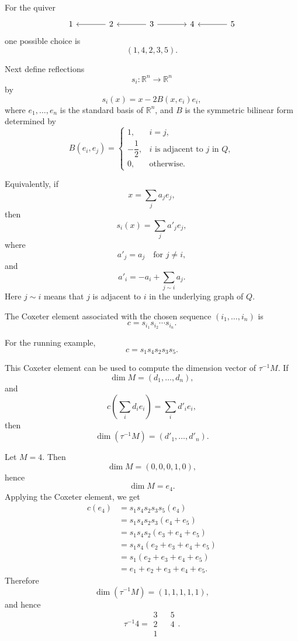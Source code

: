 \documentclass[11pt, a4paper]{report}
\begin{document}
For the quiver
\[
    \begin{tikzcd}[column sep=large]
        1 & 2 \arrow[l] & 3 \arrow[l] \arrow[r] & 4 & 5 \arrow[l]
    \end{tikzcd}
\]
one possible choice is
\[
    (1,4,2,3,5).
\]

Next define reflections
\[
    s_i:\mathbb{R}^n\longrightarrow \mathbb{R}^n
\]
by
\[
    s_i(x)=x-2B(x,e_i)e_i,
\]
where \(e_1,\dots,e_n\) is the standard basis of \(\mathbb{R}^n\), and \(B\) is
the symmetric bilinear form determined by
\[
    B(e_i,e_j)=
    \begin{cases}
        1, & i=j,\\[1mm]
        -\dfrac{1}{2}, & i \text{ is adjacent to } j \text{ in } Q,\\[2mm]
        0, & \text{otherwise}.
    \end{cases}
\]

Equivalently, if
\[
    x=\sum_j a_j e_j,
\]
then
\[
    s_i(x)=\sum_j a'_j e_j,
\]
where
\[
    a'_j=a_j \quad \text{for } j\neq i,
\]
and
\[
    a'_i=-a_i+\sum_{j\sim i}a_j.
\]
Here \(j\sim i\) means that \(j\) is adjacent to \(i\) in the underlying graph of
\(Q\).

\begin{definition}
    The Coxeter element associated with the chosen sequence
    \((i_1,\dots,i_n)\) is
    \[
        c=s_{i_1}s_{i_2}\cdots s_{i_n}.
    \]
\end{definition}

For the running example,
\[
    c=s_1s_4s_2s_3s_5.
\]

This Coxeter element can be used to compute the dimension vector of
\(\tau^{-1}M\). If
\[
    \dim M=(d_1,\dots,d_n),
\]
and
\[
    c\left(\sum_i d_i e_i\right)=\sum_i d'_i e_i,
\]
then
\[
    \dim(\tau^{-1}M)=(d'_1,\dots,d'_n).
\]

\begin{example}
    Let \(M=4\). Then
    \[
        \dim M=(0,0,0,1,0),
    \]
    hence
    \[
        \dim M=e_4.
    \]
    Applying the Coxeter element, we get
    \[
    \begin{aligned}
        c(e_4)
        &=s_1s_4s_2s_3s_5(e_4)\\
        &=s_1s_4s_2s_3(e_4+e_5)\\
        &=s_1s_4s_2(e_3+e_4+e_5)\\
        &=s_1s_4(e_2+e_3+e_4+e_5)\\
        &=s_1(e_2+e_3+e_4+e_5)\\
        &=e_1+e_2+e_3+e_4+e_5.
    \end{aligned}
    \]
    Therefore
    \[
        \dim(\tau^{-1}M)=(1,1,1,1,1),
    \]
    and hence
    \[
        \tau^{-1}4
        =
        \begin{array}{ccc}
            3&&5\\[-1mm]
            2&&4\\[-1mm]
            1&&
        \end{array}.
    \]
\end{example}
\end{document}
